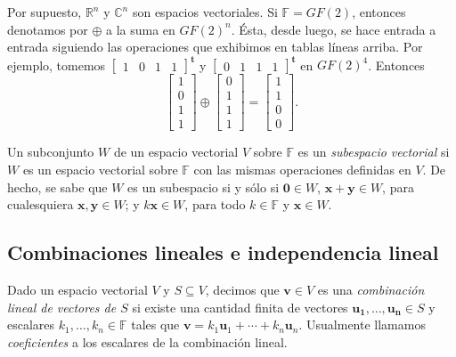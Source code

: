            Por supuesto, $\mathbb{R}^{n}$ y $\mathbb{C}^{n}$ son espacios vectoriales. Si $\mathbb{F} = GF(2)$, entonces denotamos por $\oplus$ a la suma en $GF(2)^{n}$. Ésta, desde luego, se hace entrada a entrada siguiendo las operaciones que exhibimos en tablas líneas arriba. Por ejemplo, tomemos $\begin{bmatrix} 1 & 0 & 1 & 1 \end{bmatrix}^{\mathbf{t}}$ y $\begin{bmatrix} 0 & 1 & 1 & 1 \end{bmatrix}^\mathbf{t}$ en $GF(2)^{4}$. Entonces 
                $$ \begin{bmatrix}
                1 \\
                0 \\
                1\\
                1
                \end{bmatrix} \oplus \begin{bmatrix}
                0 \\
                1\\
                1\\
                1
                \end{bmatrix}  =\begin{bmatrix}
                1 \\
                1 \\
                0\\
                0
                \end{bmatrix}.
                $$

            Un subconjunto $W$ de un espacio vectorial $V$ sobre $\mathbb{F}$ es un \textit{subespacio vectorial} si $W$ es un espacio vectorial sobre $\mathbb{F}$ con las mismas operaciones definidas en $V$. De hecho, se sabe que $W$ es un subespacio si  y sólo si $\mathbf{0} \in W$, $\mathbf{x + y} \in W$, para cualesquiera $\mathbf{x,y} \in W$; y $k\mathbf{x} \in W$, para todo $k \in \mathbb{F}$ y $\mathbf{x} \in W$.

        \subsection{Combinaciones lineales e independencia lineal}
            Dado un  espacio vectorial $V$ y $S \subseteq V$, decimos que $\mathbf{v} \in V$ es una \textit{combinación lineal de vectores de $S$} si existe una cantidad finita de vectores $\mathbf{u_{1}, \ldots, u_{n}} \in S$ y escalares $k_{1}, \ldots, k_{n}\in \mathbb{F}$ tales que $\mathbf{v} = k_{1}\mathbf{u}_{1} + \cdots + k_{n}\mathbf{u}_{n}$. Usualmente llamamos \textit{coeficientes} a los escalares de la combinación lineal.

